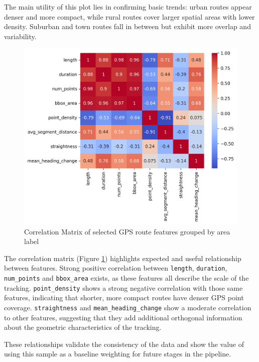 \documentclass[a4paper,12pt,twoside]{scrreprt}
\begin{document}
The main utility of this plot lies in
confirming basic trends: urban routes appear denser and more compact, while
rural routes cover larger spatial areas with lower density. Suburban and town
routes fall in between but exhibit more overlap and variability.

\begin{figure}[htbp]
  \centering
  \includegraphics[width=\textwidth]{Figures/sample_correlation_matrix.png}
  \caption{Correlation Matrix of selected GPS route features grouped by area
    label}
  \label{fig:sample_correlation_matrix}
\end{figure}
\FloatBarrier

The correlation matrix (Figure \ref{fig:sample_correlation_matrix}) highlights
expected and useful relationship between features.
Strong positive correlation between \texttt{length}, \texttt{duration},
\texttt{num\_points} and \texttt{bbox\_area} exists, as these features all
describe the scale of the
tracking.
\texttt{point\_density} shows a strong negative correlation with those same
features, indicating that shorter, more compact routes have denser GPS point
coverage.
\texttt{straightness} and \texttt{mean\_heading\_change} show a moderate
correlation to other features, suggesting that they add additional orthogonal
information about the geometric characteristics of the tracking.

These relationships validate the consistency of the data and show the value of
using this sample as a baseline weighting for future stages in the pipeline.
\end{document}
